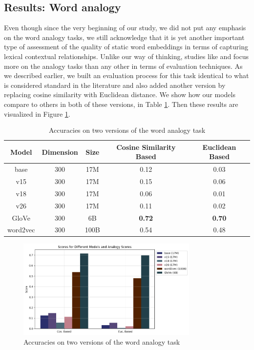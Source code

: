 \subsection{Results: Word analogy}

Even though since the very beginning of our study, we did not put any emphasis on the word analogy tasks, we still acknowledge that it is yet another important type of assessment of the quality of static word embeddings in terms of capturing lexical contextual relationships. Unlike our way of thinking, studies like \cite{glove} and \cite{w2v} focus more on the analogy tasks than any other in terms of evaluation techniques. As we described earlier, we built an evaluation process for this task identical to what is considered standard in the literature and also added another version by replacing cosine similarity with Euclidean distance. We show how our models compare to others in both of these versions, in Table \ref{tab:analogy-table}. Then these results are visualized in Figure \ref{fig:analogy-plot}. 

\begin{table}[h]
\centering
\setlength\tabcolsep{4pt}
\begin{tabular}{|ccc|cc|}
\hline
Model & Dimension & Size & Cosine Similarity Based & Euclidean Based \\ \hline
base & 300 & 17M & 0.12 & 0.03 \\
v15 & 300 & 17M & 0.15 & 0.06 \\
v18 & 300 & 17M & 0.06 & 0.01 \\
v26 & 300 & 17M & 0.11 & 0.02 \\ \hline
GloVe & 300 & 6B & \textbf{0.72} & \textbf{0.70} \\
word2vec & 300 & 100B & 0.54 & 0.48 \\ \hline
\end{tabular}
\caption{Accuracies on two versions of the word analogy task}
\label{tab:analogy-table}
\end{table}

\begin{figure}[h]
    \centering
    \includegraphics[width=0.8\textwidth]{img/analogy-plot.png}
    \caption{Accuracies on two versions of the word analogy task}
    \label{fig:analogy-plot}
\end{figure}


